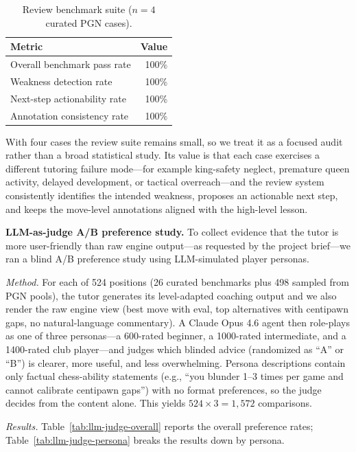 \documentclass[11pt]{article}
\begin{document}
\begin{table}[h]
\centering
\caption{Review benchmark suite ($n=4$ curated PGN cases).}
\label{tab:review-bench}
\begin{tabular}{@{}lr@{}}
\toprule
Metric & Value \\
\midrule
Overall benchmark pass rate       & 100\% \\
Weakness detection rate           & 100\% \\
Next-step actionability rate      & 100\% \\
Annotation consistency rate       & 100\% \\
\bottomrule
\end{tabular}
\end{table}

With four cases the review suite remains small, so we treat it as a focused audit rather than a broad statistical study. Its value is that each case exercises a different tutoring failure mode---for example king-safety neglect, premature queen activity, delayed development, or tactical overreach---and the review system consistently identifies the intended weakness, proposes an actionable next step, and keeps the move-level annotations aligned with the high-level lesson.

\textbf{LLM-as-judge A/B preference study.}
To collect evidence that the tutor is more user-friendly than raw engine output---as requested by the project brief---we ran a blind A/B preference study using LLM-simulated player personas.

\emph{Method.} For each of 524 positions (26 curated benchmarks plus 498 sampled from PGN pools), the tutor generates its level-adapted coaching output and we also render the raw engine view (best move with eval, top alternatives with centipawn gaps, no natural-language commentary). A Claude Opus 4.6 agent then role-plays as one of three personas---a 600-rated beginner, a 1000-rated intermediate, and a 1400-rated club player---and judges which blinded advice (randomized as ``A'' or ``B'') is clearer, more useful, and less overwhelming. Persona descriptions contain only factual chess-ability statements (e.g., ``you blunder 1--3 times per game and cannot calibrate centipawn gaps'') with no format preferences, so the judge decides from the content alone. This yields $524 \times 3 = 1{,}572$ comparisons.

\emph{Results.} Table~\ref{tab:llm-judge-overall} reports the overall preference rates; Table~\ref{tab:llm-judge-persona} breaks the results down by persona.
\end{document}
